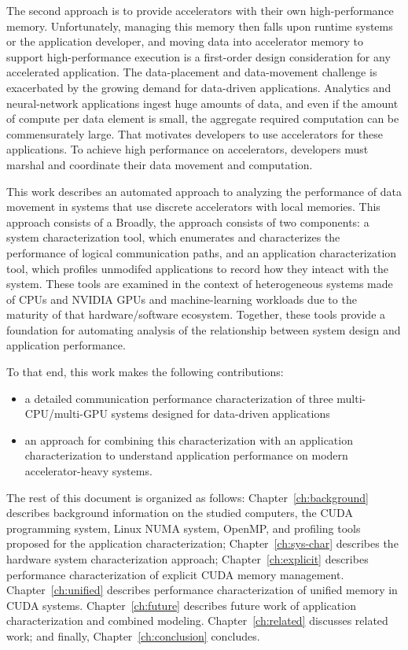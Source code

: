 The second approach is to provide accelerators with their own high-performance memory.
Unfortunately, managing this memory then falls upon runtime systems or the application developer, and moving data into accelerator memory to support high-performance execution is a first-order design consideration for any accelerated application.
The data-placement and data-movement challenge is exacerbated by the growing demand for data-driven applications.
Analytics and neural-network applications ingest huge amounts of data, and even if the amount of compute per data element is small, the aggregate required computation can be commensurately large.
That motivates developers to use accelerators for these applications.
To achieve high performance on accelerators, developers must marshal and coordinate their data movement and computation.

This work describes an automated approach to analyzing the performance of data movement in systems that use discrete accelerators with local memories.
This approach consists of a
Broadly, the approach consists of two components: a system characterization tool, which enumerates and characterizes the performance of logical communication paths, and an application characterization tool, which profiles unmodifed applications to record how they inteact with the system.
These tools are examined in the context of heterogeneous systems made of CPUs and NVIDIA GPUs and machine-learning workloads due to the maturity of that hardware/software ecosystem.
Together, these tools provide a foundation for automating analysis of the relationship between system design and application performance.

To that end, this work makes the following contributions:
\begin{itemize}
 \item a detailed communication performance characterization of three multi-CPU/multi-GPU systems designed for data-driven applications
 \item an approach for combining this characterization with an application characterization to understand application performance on modern accelerator-heavy systems.
\end{itemize}

The rest of this document is organized as follows:
Chapter~\ref{ch:background} describes background information on the studied computers, the CUDA programming system, Linux NUMA system, OpenMP, and profiling tools proposed for the application characterization;
Chapter~\ref{ch:sys-char} describes the hardware system characterization approach;
Chapter~\ref{ch:explicit} describes performance characterization of explicit CUDA memory management.
Chapter~\ref{ch:unified} describes performance characterization of unified memory in CUDA systems.
Chapter~\ref{ch:future} describes future work of application characterization and combined modeling.
Chapter~\ref{ch:related} discusses related work;
and finally, Chapter~\ref{ch:conclusion} concludes.